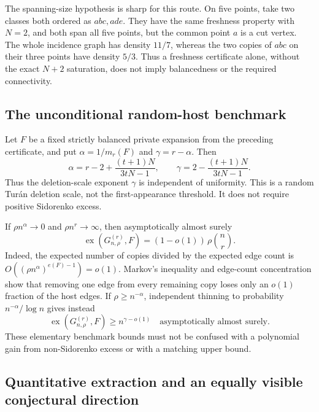 The spanning-size hypothesis is sharp for this route. On five points,
take two classes both ordered as $abc,ade$. They have the same freshness
property with $N=2$, and both span all five points, but the common point
$a$ is a cut vertex. The whole incidence graph has density $11/7$,
whereas the two copies of $abc$ on their three points have density $5/3$.
Thus a freshness certificate alone, without the exact $N+2$ saturation,
does not imply balancedness or the required connectivity.

\subsection{The unconditional random-host benchmark}

Let $F$ be a fixed strictly balanced private expansion from the preceding
certificate, and put $\alpha=1/m_r(F)$ and $\gamma=r-\alpha$. Then
\[
 \alpha=r-2+\frac{(t+1)N}{3tN-1},\qquad
 \gamma=2-\frac{(t+1)N}{3tN-1}.
\]
Thus the deletion-scale exponent $\gamma$ is independent of uniformity.
This is a random Tur\'an deletion scale, not the first-appearance threshold.
It does not require positive Sidorenko excess.

If $\rho n^\alpha\to0$ and $\rho n^r\to\infty$, then asymptotically
almost surely
\[
 \operatorname{ex}(G^{(r)}_{n,\rho},F)
       =(1-o(1))\,\rho\binom nr.
\]
Indeed, the expected number of copies divided by the expected edge count
is $O((\rho n^\alpha)^{e(F)-1})=o(1)$. Markov's inequality and edge-count
concentration show that removing one edge from every remaining copy loses
only an $o(1)$ fraction of the host edges. If $\rho\ge n^{-\alpha}$,
independent thinning to probability $n^{-\alpha}/\log n$ gives instead
\[
 \operatorname{ex}(G^{(r)}_{n,\rho},F)\ge n^{\gamma-o(1)}
 \quad\text{asymptotically almost surely}.
\]
These elementary benchmark bounds must not be confused with a polynomial
gain from non-Sidorenko excess or with a matching upper bound.

\subsection{Quantitative extraction and an equally visible conjectural direction}


